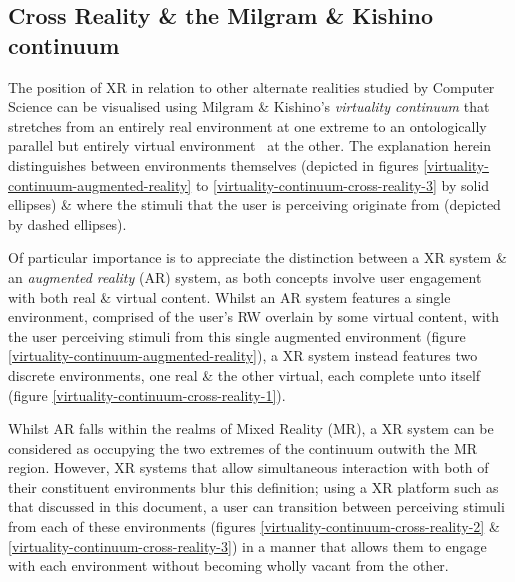 
\clearpage

\subsection{Cross Reality \& the Milgram \& Kishino continuum}

The position of XR in relation to other alternate realities studied by Computer Science can be visualised using Milgram \& Kishino's \textit{virtuality continuum} that stretches from an entirely real environment at one extreme to an ontologically parallel but entirely virtual environment~\cite{Qvortrup2002} at the other. The explanation herein distinguishes between environments themselves (depicted in figures \ref{virtuality-continuum-augmented-reality} to \ref{virtuality-continuum-cross-reality-3} by solid ellipses) \& where the stimuli that the user is perceiving originate from (depicted by dashed ellipses).


Of particular importance is to appreciate the distinction between a XR system \& an \textit{augmented reality} (AR) system, as both concepts involve user engagement with both real \& virtual content. Whilst an AR system features a single environment, comprised of the user's RW overlain by some virtual content, with the user perceiving stimuli from this single augmented environment (figure \ref{virtuality-continuum-augmented-reality}), a XR system instead features two discrete environments, one real \& the other virtual, each complete unto itself (figure \ref{virtuality-continuum-cross-reality-1}).

Whilst AR falls within the realms of Mixed Reality (MR), a XR system can be considered as occupying the two extremes of the continuum outwith the MR region. However, XR systems that allow simultaneous interaction with both of their constituent environments blur this definition; using a XR platform such as that discussed in this document, a user can transition between perceiving stimuli from each of these environments (figures \ref{virtuality-continuum-cross-reality-2} \& \ref{virtuality-continuum-cross-reality-3}) in a manner that allows them to engage with each environment without becoming wholly vacant from the other.

